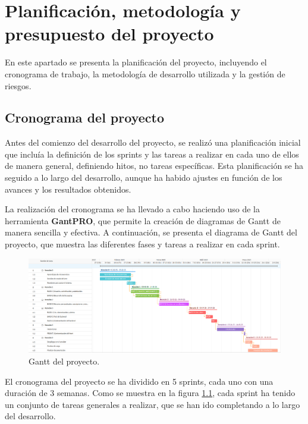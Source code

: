 \chapter{Planificación, metodología y presupuesto del proyecto}\label{cap:planificacion}

En este apartado se presenta la planificación del proyecto, incluyendo el cronograma de trabajo, la metodología de desarrollo utilizada y la gestión de riesgos.

\section{Cronograma del proyecto}

Antes del comienzo del desarrollo del proyecto, se realizó una planificación inicial que incluía la definición de los sprints y las tareas a realizar en cada uno de ellos de manera general, definiendo hitos, no tareas específicas. Esta planificación se ha seguido a lo largo del desarrollo, aunque ha habido ajustes en función de los avances y los resultados obtenidos.

La realización del cronograma se ha llevado a cabo haciendo uso de la herramienta \textbf{GantPRO}\cite{webGanttPro}, que permite la creación de diagramas de Gantt de manera sencilla y efectiva. A continuación, se presenta el diagrama de Gantt del proyecto, que muestra las diferentes fases y tareas a realizar en cada sprint.

\begin{figure}[ht!] 
    \centering 
    \includegraphics[width=1\textwidth]{figures/04_gantt.png}
    \caption{Gantt del proyecto.} 
    \label{gantt}
\end{figure}

El cronograma del proyecto se ha dividido en 5 sprints, cada uno con una duración de 3 semanas. Como se muestra en la figura \ref{gantt}, cada sprint ha tenido un conjunto de tareas generales a realizar, que se han ido completando a lo largo del desarrollo.

